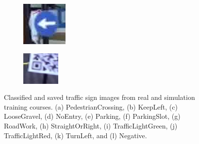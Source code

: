 \begin{figure}[h]
\begin{subfigure}[b]{0.15\linewidth}
    \caption{}
  \end{subfigure}
  \begin{subfigure}[b]{0.15\linewidth}
    \includegraphics[width=\linewidth]{figures/signs/TurnLeft.jpg}
    \caption{}
  \end{subfigure}
  \begin{subfigure}[b]{0.15\linewidth}
    \includegraphics[width=\linewidth]{figures/signs/Negative.jpg}
    \caption{}
  \end{subfigure}
  \caption{Classified and saved traffic sign images from real and simulation
    training courses. (a) PedestrianCrossing, (b) KeepLeft, (c) LooseGravel, (d)
    NoEntry, (e) Parking, (f) ParkingSlot, (g) RoadWork, (h) StraightOrRight,
    (i) TrafficLightGreen, (j) TrafficLightRed, (k) TurnLeft, and (l)
    Negative.} \label{figure:traffic-sign-classes}
\end{figure}

